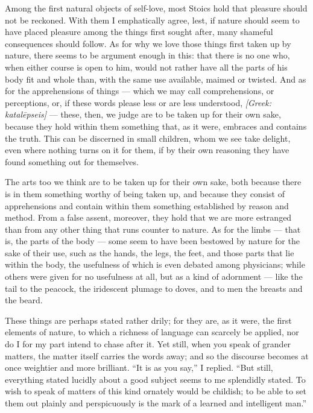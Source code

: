  Among the first natural objects of self-love, most Stoics hold that pleasure should not be reckoned. With them I emphatically agree, lest, if nature should seem to have placed pleasure among the things first sought after, many shameful consequences should follow. As for why we love those things first taken up by nature, there seems to be argument enough in this: that there is no one who, when either course is open to him, would not rather have all the parts of his body fit and whole than, with the same use available, maimed or twisted. And as for the apprehensions of things — which we may call comprehensions, or perceptions, or, if these words please less or are less understood, \textit{[Greek: katalēpseis]} — these, then, we judge are to be taken up for their own sake, because they hold within them something that, as it were, embraces and contains the truth. This can be discerned in small children, whom we see take delight, even where nothing turns on it for them, if by their own reasoning they have found something out for themselves.

 The arts too we think are to be taken up for their own sake, both because there is in them something worthy of being taken up, and because they consist of apprehensions and contain within them something established by reason and method. From a false assent, moreover, they hold that we are more estranged than from any other thing that runs counter to nature. As for the limbs — that is, the parts of the body — some seem to have been bestowed by nature for the sake of their use, such as the hands, the legs, the feet, and those parts that lie within the body, the usefulness of which is even debated among physicians; while others were given for no usefulness at all, but as a kind of adornment — like the tail to the peacock, the iridescent plumage to doves, and to men the breasts and the beard.

 These things are perhaps stated rather drily; for they are, as it were, the first elements of nature, to which a richness of language can scarcely be applied, nor do I for my part intend to chase after it. Yet still, when you speak of grander matters, the matter itself carries the words away; and so the discourse becomes at once weightier and more brilliant. ``It is as you say,'' I replied. ``But still, everything stated lucidly about a good subject seems to me splendidly stated. To wish to speak of matters of this kind ornately would be childish; to be able to set them out plainly and perspicuously is the mark of a learned and intelligent man.''

